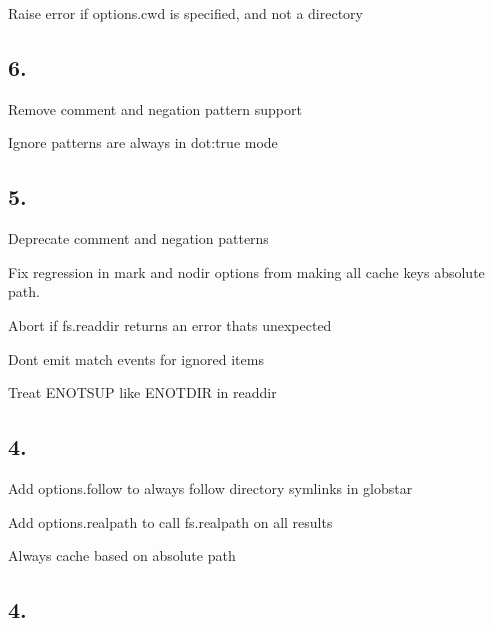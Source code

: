 
\begin{DoxyItemize}
\item Raise error if {\ttfamily options.\+cwd} is specified, and not a directory
\end{DoxyItemize}

\subsection*{6.}


\begin{DoxyItemize}
\item Remove comment and negation pattern support
\item Ignore patterns are always in {\ttfamily dot\+:true} mode
\end{DoxyItemize}

\subsection*{5.}


\begin{DoxyItemize}
\item Deprecate comment and negation patterns
\item Fix regression in {\ttfamily mark} and {\ttfamily nodir} options from making all cache keys absolute path.
\item Abort if {\ttfamily fs.\+readdir} returns an error that\textquotesingle{}s unexpected
\item Don\textquotesingle{}t emit {\ttfamily match} events for ignored items
\item Treat E\+N\+O\+T\+S\+UP like E\+N\+O\+T\+D\+IR in readdir
\end{DoxyItemize}

\subsection*{4.}


\begin{DoxyItemize}
\item Add {\ttfamily options.\+follow} to always follow directory symlinks in globstar
\item Add {\ttfamily options.\+realpath} to call {\ttfamily fs.\+realpath} on all results
\item Always cache based on absolute path
\end{DoxyItemize}

\subsection*{4.}


